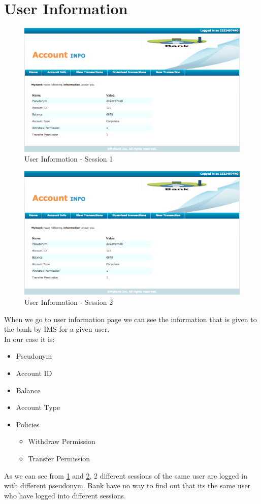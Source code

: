 \section{User Information}
\begin{figure}[h]
	\centering
	\includegraphics[width=\textwidth]{figures/Account1}
	\caption{User Information - Session 1}
	\label{fig:Account1}
\end{figure}	
\begin{figure}[h]
	\centering
	\includegraphics[width=\textwidth]{figures/Account1}
	\caption{User Information - Session 2}
	\label{fig:Account2}
\end{figure}
When we go to user information page we can see the information that is given to the bank by IMS for a given user.
\\In our case it is:
\begin{itemize}
	\item Pseudonym
	\item Account ID
	\item Balance
	\item Account Type
	\item Policies
	\begin{itemize}
		\item Withdraw Permission
		\item Transfer Permission
	\end{itemize}
\end{itemize}
As we can see from \ref{fig:Account1} and \ref{fig:Account2}, 2 different sessions of the same user are logged in with different pseudonym. Bank have no way to find out that its the same user who have logged into different sessions.

